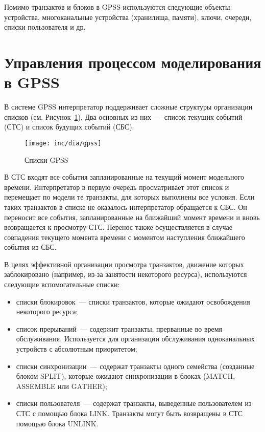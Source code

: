 Помимо транзактов и блоков в GPSS используются следующие объекты: устройства, многоканальные устройства (хранилища, памяти), ключи, очереди, списки пользователя и др.


\section{Управления процессом моделирования в GPSS}

В системе GPSS интерпретатор поддерживает сложные структуры организации списков (см. Рисунок~\ref{fig:GPSSChains}).\cite{ImitGPSS} Два основных из них~--- список текущих событий (СТС) и список будущих событий (СБС).

\begin{figure}[ht]
  \centering
  \texttt{[image: inc/dia/gpss]}
  \caption{Списки GPSS}
  \label{fig:GPSSChains}
\end{figure}

В СТС входят все события запланированные  на текущий  момент модельного времени. Интерпретатор в первую очередь просматривает этот список и перемещает по модели те транзакты, для которых выполнены все условия. Если таких транзактов в списке не оказалось интерпретатор обращается к СБС. Он переносит все события, запланированные на ближайший момент времени и вновь возвращается к просмотру СТС. Перенос также осуществляется в случае совпадения текущего момента времени с моментом наступления ближайшего события из СБС.

В целях эффективной организации просмотра транзактов, движение которых заблокировано (например, из-за занятости некоторого ресурса), используются следующие вспомогательные списки:

\begin{itemize}
\item списки блокировок~--- списки транзактов, которые ожидают освобождения некоторого ресурса;
\item список прерываний~--- содержит транзакты, прерванные во время обслуживания. Используется для организации обслуживания одноканальных устройств с абсолютным приоритетом;
\item списки синхронизации~--- содержат транзакты одного семейства (созданные блоком SPLIT), которые ожидают синхронизации в блоках (MATCH, ASSEMBLE или GATHER);
\item списки пользователя~--- содержат транзакты, выведенные пользователем из СТС с помощью блока LINK. Транзакты могут быть возвращены в СТС помощью блока UNLINK.
\end{itemize}




